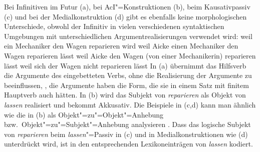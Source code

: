 Bei Infinitiven im Futur (a), bei AcI"=Konstruktionen (b), 
beim Kausativpassiv (c)
und bei der Medialkonstruktion (d) gibt es ebenfalls
keine morphologischen Unterschiede, obwohl der Infinitiv in vielen verschiedenen 
syntaktischen Umgebungen mit unterschiedlichen Argumentrealisierungen verwendet wird:
\eal
\label{bsp-kasus-reparieren}
\ex weil    ein Mechaniker den Wagen                   reparieren wird
\ex weil    Aicke          einen Mechaniker  den Wagen reparieren lässt
\ex weil    Aicke          den Wagen     (von einer Mechanikerin) reparieren lässt
\ex weil    sich der Wagen     nicht reparieren lässt
\zl
In (a) übernimmt das Hilfsverb die Argumente des eingebetteten Verbs, ohne die Realisierung
der Argumente zu beeinflussen, \dash, die Argumente haben die Form, die sie in einem Satz mit finitem
Hauptverb auch hätten. In (b) wird das Subjekt
von \emph{reparieren} als Objekt von \emph{lassen} realisiert und bekommt Akkusativ.
Die Beispiele in (c,d) kann man ähnlich wie die in (b)
als Objekt"=zu"=Objekt"=Anhebung
bzw.\ Objekt"=zu"=Subjekt"=Anhebung analysieren \parencites[]{Bierwisch90a}[]{Gunkel99a}[Abschnitt~4.4.2]{Gunkel2003b}.
Dass das logische Subjekt von \emph{reparieren} beim \emph{lassen}"=Passiv in (c)
und in Medialkonstruktionen wie (d) unterdrückt wird, ist in den entsprechenden Lexikoneinträgen
von \emph{lassen} kodiert. 

